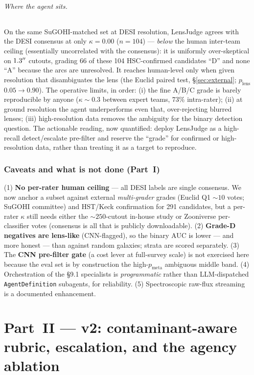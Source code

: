 \documentclass[11pt,letterpaper]{article}
\newcommand{\plens}{\ensuremath{p_{\mathrm{lens}}}}
\newcommand{\pmeta}{\ensuremath{p_{\mathrm{meta}}}}
\newcommand{\xmUnion}{291}           %
\newcommand{\eucCdesi}{0.05}         %
\newcommand{\eucCeuc}{0.90}          %
\newcommand{\ceilAgent}{0.00}        %
\newcommand{\ceilAgentN}{104}        %
\newcommand{\rojasIntra}{73}         %
\begin{document}
\paragraph{Where the agent sits.} On the same SuGOHI-matched set at DESI resolution, LensJudge
agrees with the DESI consensus at only $\kappa=\ceilAgent$ ($n=\ceilAgentN$) --- \emph{below} the
human inter-team ceiling (essentially uncorrelated with the consensus): it is uniformly
over-skeptical on $1.3^{\prime\prime}$ cutouts, grading 66 of these 104 HSC-confirmed candidates ``D''
and none ``A'' because the arcs are unresolved. It reaches human-level only
when given resolution that disambiguates the lens (the Euclid paired test, \S\ref{sec:external};
$\plens$ $\eucCdesi\rightarrow\eucCeuc$). The operative limits, in order: (i) the fine A/B/C grade
is barely reproducible by anyone ($\kappa\sim0.3$ between expert teams, $\rojasIntra\%$ intra-rater);
(ii) at ground resolution the agent underperforms even that, over-rejecting blurred lenses;
(iii) high-resolution data removes the ambiguity for the binary detection question. The actionable
reading, now quantified: deploy LensJudge as a high-recall detect/escalate pre-filter and reserve
the ``grade'' for confirmed or high-resolution data, rather than treating it as a target to reproduce.

\section{Caveats and what is not done (Part~I)}
(1) \textbf{No per-rater human ceiling} --- all DESI labels are single consensus. We now anchor a
subset against external \emph{multi-grader} grades (Euclid Q1 ${\sim}10$ votes; SuGOHI committee)
and HST/Keck confirmation for \xmUnion{} candidates, but a per-rater $\kappa$ still needs either
the ${\sim}250$-cutout in-house study or Zooniverse per-classifier votes (consensus is all that is
publicly downloadable). (2) \textbf{Grade-D negatives are lens-like} (CNN-flagged), so the binary AUC is
lower --- and more honest --- than against random galaxies; strata are scored separately.
(3) The \textbf{CNN pre-filter gate} (a cost lever at full-survey scale) is not exercised
here because the eval set is by construction the high-\pmeta{} ambiguous middle band.
(4) Orchestration of the \S9.1 specialists is \emph{programmatic} rather than LLM-dispatched
\texttt{AgentDefinition} subagents, for reliability. (5) Spectroscopic raw-flux streaming is
a documented enhancement.

\part{Part~II --- v2: contaminant-aware rubric, escalation, and the agency ablation}
\end{document}
